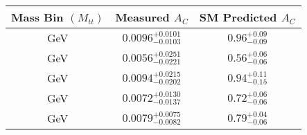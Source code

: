 \begin{tabular}{|c|c|c|} 
\hline
    Mass Bin $(M_{tt})$ & Measured $A_C$ & SM Predicted $A_C$ \\ 
    \hline
    [1000,1500] GeV & $0.0096^{+0.0101}_{-0.0103}$ & $0.96^{+0.09}_{-0.09}$ \\ 
    [0,500] GeV & $0.0056^{+0.0251}_{-0.0221}$ & $0.56^{+0.06}_{-0.06}$ \\ 
    [1500,Inf] GeV & $0.0094^{+0.0215}_{-0.0202}$ & $0.94^{+0.11}_{-0.15}$ \\ 
    [500,750] GeV & $0.0072^{+0.0130}_{-0.0137}$ & $0.72^{+0.06}_{-0.06}$ \\ 
    [750,1000] GeV & $0.0079^{+0.0075}_{-0.0082}$ & $0.79^{+0.04}_{-0.06}$ \\ 
\hline
\end{tabular}